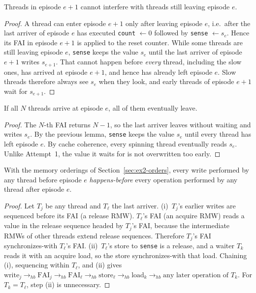 \begin{lemma}[Reusability]
Threads in episode $e+1$ cannot interfere with threads still leaving
episode $e$.
\end{lemma}
\begin{proof}
A thread can enter episode $e+1$ only after leaving episode $e$, i.e.\ after
the last arriver of episode $e$ has executed \texttt{count} $\gets 0$
followed by \texttt{sense} $\gets s_e$. Hence its FAI in episode $e+1$ is
applied to the reset counter. While some threads are still leaving episode
$e$, \texttt{sense} keeps the value $s_e$ until the last arriver of episode
$e+1$ writes $s_{e+1}$. That cannot happen before \emph{every} thread,
including the slow ones, has arrived at episode $e+1$, and hence has already
left episode $e$. Slow threads therefore always see $s_e$ when they look,
and early threads of episode $e+1$ wait for $s_{e+1}$.
\end{proof}

\begin{lemma}[Liveness]
If all $N$ threads arrive at episode $e$, all of them eventually leave.
\end{lemma}
\begin{proof}
The $N$-th FAI returns $N-1$, so the last arriver leaves without waiting and
writes $s_e$. By the previous lemma, \texttt{sense} keeps the value $s_e$
until every thread has left episode $e$. By cache coherence, every spinning
thread eventually reads $s_e$. Unlike Attempt~1, the value it waits for is
not overwritten too early.
\end{proof}

\begin{proposition}
With the memory orderings of Section~\ref{sec:ex2-orders}, every write
performed by any thread before episode $e$ \emph{happens-before} every
operation performed by any thread after episode $e$.
\end{proposition}
\begin{proof}
Let $T_j$ be any thread and $T_\ell$ the last arriver.
(i)~$T_j$'s earlier writes are sequenced before its FAI (a release RMW).
$T_\ell$'s FAI (an acquire RMW) reads a value in the release sequence headed
by $T_j$'s FAI, because the intermediate RMWs of other threads extend
release sequences. Therefore $T_j$'s FAI synchronizes-with $T_\ell$'s FAI.
(ii)~$T_\ell$'s store to \texttt{sense} is a release, and a waiter $T_k$
reads it with an acquire load, so the store synchronizes-with that load.
Chaining (i), sequencing within $T_\ell$, and (ii) gives
$\text{write}_j \rightarrow_{hb} \text{FAI}_j \rightarrow_{hb}
\text{FAI}_\ell \rightarrow_{hb} \text{store}_\ell \rightarrow_{hb}
\text{load}_k \rightarrow_{hb} \text{any later operation of } T_k$.
For $T_k = T_\ell$, step (ii) is unnecessary.
\end{proof}


